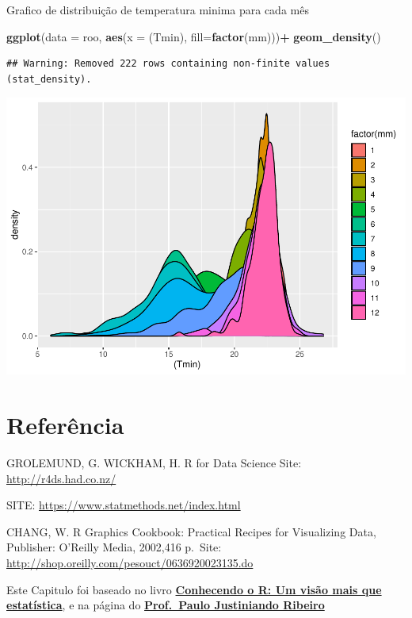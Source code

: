 \documentclass[
]{book}
\newenvironment{Shaded}{\begin{snugshade}}{\end{snugshade}}
\newcommand{\DataTypeTok}[1]{\textcolor[rgb]{0.13,0.29,0.53}{#1}}
\newcommand{\KeywordTok}[1]{\textcolor[rgb]{0.13,0.29,0.53}{\textbf{#1}}}
\newcommand{\NormalTok}[1]{#1}
\newcommand{\OperatorTok}[1]{\textcolor[rgb]{0.81,0.36,0.00}{\textbf{#1}}}
\newcommand{\StringTok}[1]{\textcolor[rgb]{0.31,0.60,0.02}{#1}}
\begin{document}
Grafico de distribuição de temperatura minima para cada mês

\begin{Shaded}
\begin{Highlighting}[]
\KeywordTok{ggplot}\NormalTok{(}\DataTypeTok{data =}\NormalTok{ roo, }\KeywordTok{aes}\NormalTok{(}\DataTypeTok{x =}\NormalTok{ (Tmin), }\DataTypeTok{fill=}\KeywordTok{factor}\NormalTok{(mm)))}\OperatorTok{+}
\StringTok{  }\KeywordTok{geom_density}\NormalTok{() }
\end{Highlighting}
\end{Shaded}

\begin{verbatim}
## Warning: Removed 222 rows containing non-finite values (stat_density).
\end{verbatim}

\includegraphics{TudodoR_files/figure-latex/unnamed-chunk-243-1.pdf}

\hypertarget{referuxeancia-3}{%
\section{Referência}\label{referuxeancia-3}}

GROLEMUND, G. WICKHAM, H. R for Data Science Site: \url{http://r4ds.had.co.nz/}

SITE: \url{https://www.statmethods.net/index.html}

CHANG, W. R Graphics Cookbook: Practical Recipes for Visualizing Data, Publisher: O'Reilly Media, 2002,416 p.~Site: \url{http://shop.oreilly.com/pesouct/0636920023135.do}

Este Capitulo foi baseado no livro \href{https://www.editoraufv.com.br/produto/conhecendo-o-r-uma-visao-mais-que-estatistica/1109294}{\textbf{Conhecendo o R: Um visão mais que estatística}}, e na página do \href{http://www.leg.ufpr.br/~paulojus/}{\textbf{Prof.~Paulo Justiniando Ribeiro}}
\end{document}
